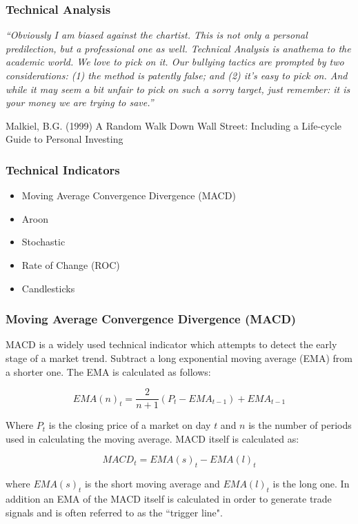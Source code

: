 \documentclass{beamer}
\begin{document}
\begin{frame}
\frametitle{Technical Analysis}

\textit{\textquotedblleft Obviously I am biased against the chartist. This is not only a personal predilection, but a professional one as well. Technical Analysis is anathema to the academic world. We love to pick on it. Our bullying tactics are prompted by two considerations: (1) the method is patently false; and (2) it's easy to pick on. And while it may seem a bit unfair to pick on such a sorry target, just remember: it is your money we are trying to save.\textquotedblright}
\begin{thebibliography}{99} %
 Malkiel, B.G. (1999)
\newblock A Random Walk Down Wall Street: Including a Life-cycle Guide to Personal Investing
\end{thebibliography}

\end{frame}

\begin{frame}
\frametitle{Technical Indicators}

\begin{itemize}
\item Moving Average Convergence Divergence (MACD) \pause
\item Aroon \pause
\item Stochastic \pause
\item Rate of Change (ROC) \pause
\item Candlesticks 
\end{itemize}

\end{frame}

\begin{frame}
\frametitle{Moving Average Convergence Divergence (MACD)}

MACD is a widely used technical indicator which attempts to detect the early stage of a market trend. Subtract a long exponential moving average (EMA) from a shorter one. The EMA is calculated as follows:

\[ EMA(n)_{t} = \dfrac{2}{n+1}(P_{t}-EMA_{t-1}) + EMA_{t-1}\]

Where $ P_{t} $ is the closing price of a market on day $ t $ and $ n $ is the number of periods used in calculating the moving average. MACD itself is calculated as:

\[ MACD_{t} = EMA(s)_{t} - EMA(l)_{t} \]

where $ EMA(s)_{t} $ is the short moving average and $ EMA(l)_{t} $ is the long one. In addition an EMA of the MACD itself is calculated in order to generate trade signals and is often referred to as the \textquotedblleft trigger line".

\end{frame}
\end{document}
